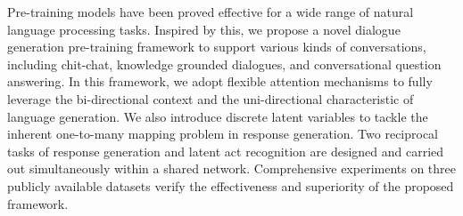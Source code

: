 Pre-training models have been proved effective for a wide range of natural language processing tasks. Inspired by this, we propose a novel dialogue generation pre-training framework to support various kinds of conversations, including chit-chat, knowledge grounded dialogues, and conversational question answering. In this framework, we adopt flexible attention mechanisms to fully leverage the bi-directional context and the uni-directional characteristic of language generation. We also introduce discrete latent variables to tackle the inherent one-to-many mapping problem in response generation. Two reciprocal tasks of response generation and latent act recognition are designed and carried out simultaneously within a shared network. Comprehensive experiments on three publicly available datasets verify the effectiveness and superiority of the proposed framework.
